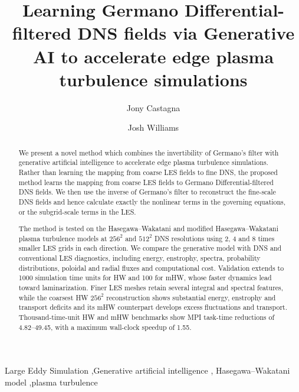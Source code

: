 \documentclass[authoryear,preprint,review,12pt]{elsarticle}
\begin{document}
\begin{frontmatter}

\title{Learning Germano Differential-filtered DNS fields via Generative AI to accelerate edge plasma turbulence simulations}

\author[Hartree]{Jony Castagna}
\author[Hartree]{Josh Williams}


\begin{abstract}
We present a novel method which combines the invertibility of Germano's filter with generative artificial intelligence to accelerate edge plasma turbulence simulations. Rather than learning the mapping from coarse LES fields to fine DNS, the proposed method learns the mapping from coarse LES fields to Germano Differential-filtered DNS fields. We then use the inverse of Germano's filter to reconstruct the fine-scale DNS fields and hence calculate exactly the nonlinear terms in the governing equations, or the subgrid-scale terms in the LES.

The method is tested on the Hasegawa--Wakatani and modified Hasegawa--Wakatani plasma turbulence models at $256^2$ and $512^2$ DNS resolutions using 2, 4 and 8 times smaller LES grids in each direction. We compare the generative model with DNS and conventional LES diagnostics, including energy, enstrophy, spectra, probability distributions, poloidal and radial fluxes and computational cost. Validation extends to 1000 simulation time units for HW and 100 for mHW, whose faster dynamics lead toward laminarization. Finer LES meshes retain several integral and spectral features, while the coarsest HW $256^2$ reconstruction shows substantial energy, enstrophy and transport deficits and its mHW counterpart develops excess fluctuations and transport. Thousand-time-unit HW and mHW benchmarks show MPI task-time reductions of 4.82--49.45, with a maximum wall-clock speedup of 1.55.
\end{abstract}

\begin{keyword}
Large Eddy Simulation \sep Generative artificial intelligence \sep 
Hasegawa--Wakatani model \sep plasma turbulence
\end{keyword}

\end{frontmatter}
%
%
%
%
%
%
%
\end{document}
